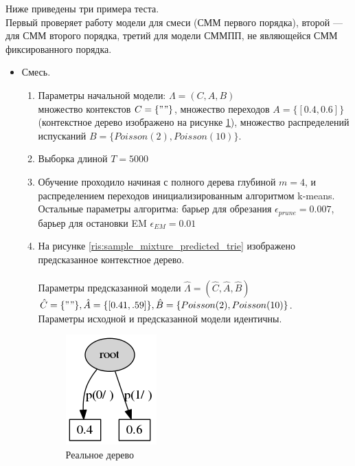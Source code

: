 \documentclass{matmex-diploma-custom}
\begin{document}
Ниже приведены три примера теста.
\\Первый проверяет работу модели для смеси (СММ первого порядка), второй --- для СММ второго порядка, третий для модели СММПП, не являющейся СММ фиксированного порядка.
\begin{itemize}
\item Смесь.
\begin{enumerate}
\item Параметры начальной модели: $\Lambda = (C, A, B)$ 
\\множество контекстов $C = \{""\}$, множество переходов $A = \{[0.4, 0.6]\}$ (контекстное дерево изображено на рисунке \ref{ris:sample_mixture_real_trie}), множество распределений испусканий $B = \{Poisson(2), Poisson(10)\}$. 
\item Выборка длиной $ T = 5000 $
\item Обучение проходило начиная с полного дерева глубиной $ m  = 4$, и распределением переходов инициализированным алгоритмом k-means. 
\\Остальные параметры алгоритма: барьер для обрезания $ \epsilon_{prune} = 0.007$, барьер для остановки EM $ \epsilon_{EM} =  0.01 $      
\item  На рисунке \ref{ris:sample_mixture_predicted_trie} изображено предсказанное контекстное дерево. 
\\
\\Параметры предсказанной модели $\hat{\Lambda} = (\hat{C}, \hat{A}, \hat{B})$  
\\$\hat{C} = \{""\}, \hat{A} = \{[0.41, .59]\}, \hat{B} = \{Poisson(2), Poisson(10)\}$.
\\Параметры исходной и предсказанной модели идентичны.
\begin{figure}[h!]\centering
\begin{minipage}[b]{0.49 \textwidth}
	\includegraphics[scale=0.57]{img/sample_mixture/real_trie_.png}
	\centering
	\caption{ Реальное дерево }
	\label{ris:sample_mixture_real_trie}
\end{minipage}
\hfil \hfil%
\begin{minipage}[b]{0.49 \textwidth}

\end{minipage}
\end{figure}
\end{enumerate}
\end{itemize}
\end{document}
